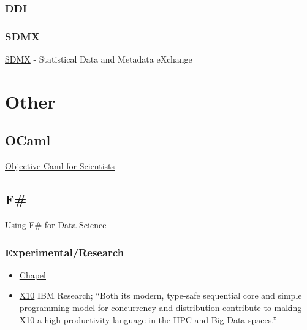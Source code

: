 \documentclass[reqno,12pt]{tufte-book}
\numberwithin{equation}{subsection}
\begin{document}
\subsection{DDI}
\label{subsect:ddi}

\subsection{SDMX}
\label{subsect:sdmx}

\href{http://sdmx.org/}{SDMX} - Statistical Data and Metadata eXchange















\chapter{Other}

\section{OCaml}
\label{sect:ocaml}

\href{http://www.ffconsultancy.com/products/ocaml_for_scientists/chapter1.html}{Objective Caml for Scientists}

\section{F\#}
\label{sect:fsharp}

\href{http://fsharp.org/data-science/}{Using F\# for Data Science}

\subsection{Experimental/Research}
\label{subs:expersch}

\begin{itemize}
\item \href{http://chapel.cray.com/overview.html}{Chapel}
\item \href{http://x10-lang.org/}{X10} IBM Research; ``Both its modern, type-safe sequential core and simple programming model for concurrency and distribution contribute to making X10 a high-productivity language in the HPC and Big Data spaces.''
\end{itemize}
\end{document}
